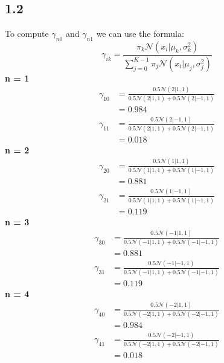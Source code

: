 \documentclass{article}
\begin{document}
\subsection*{1.2}
To compute $\gamma_{n0}$ and $\gamma_{n1}$ we can use the formula:
$$
\gamma_{ik} = \frac{\pi_k \mathcal{N}(x_i | \mu_k, \sigma_k^2)}{\sum_{j=0}^{K-1} \pi_j \mathcal{N}(x_i | \mu_j, \sigma_j^2)}
$$
\textbf{n = 1}
\begin{align*}
    \gamma_{10} &= \frac{0.5 \mathcal{N}(2 | 1, 1)}{0.5 \mathcal{N}(2 | 1, 1) + 0.5 \mathcal{N}(2 | -1, 1)}\\
    &= 0.984
\end{align*}
\begin{align*}
    \gamma_{11} &= \frac{0.5 \mathcal{N}(2 | -1, 1)}{0.5 \mathcal{N}(2 | 1, 1) + 0.5 \mathcal{N}(2 | -1, 1)}\\
    &= 0.018
\end{align*}
\textbf{n = 2}
\begin{align*}
    \gamma_{20} &= \frac{0.5 \mathcal{N}(1 | 1, 1)}{0.5 \mathcal{N}(1 | 1, 1) + 0.5 \mathcal{N}(1 | -1, 1)}\\
    &= 0.881
\end{align*}
\begin{align*}
    \gamma_{21} &= \frac{0.5 \mathcal{N}(1 | -1, 1)}{0.5 \mathcal{N}(1 | 1, 1) + 0.5 \mathcal{N}(1 | -1, 1)}\\
    &= 0.119
\end{align*}
\textbf{n = 3}
\begin{align*}
    \gamma_{30} &= \frac{0.5 \mathcal{N}(-1 | 1, 1)}{0.5 \mathcal{N}(-1 | 1, 1) + 0.5 \mathcal{N}(-1 | -1, 1)}\\
    &= 0.881
\end{align*}
\begin{align*}
    \gamma_{31} &= \frac{0.5 \mathcal{N}(-1 | -1, 1)}{0.5 \mathcal{N}(-1 | 1, 1) + 0.5 \mathcal{N}(-1 | -1, 1)}\\
    &= 0.119
\end{align*}
\textbf{n = 4}
\begin{align*}
    \gamma_{40} &= \frac{0.5 \mathcal{N}(-2 | 1, 1)}{0.5 \mathcal{N}(-2 | 1, 1) + 0.5 \mathcal{N}(-2 | -1, 1)}\\
    &= 0.984
\end{align*}
\begin{align*}
    \gamma_{41} &= \frac{0.5 \mathcal{N}(-2 | -1, 1)}{0.5 \mathcal{N}(-2 | 1, 1) + 0.5 \mathcal{N}(-2 | -1, 1)}\\
    &= 0.018
\end{align*}
\end{document}
